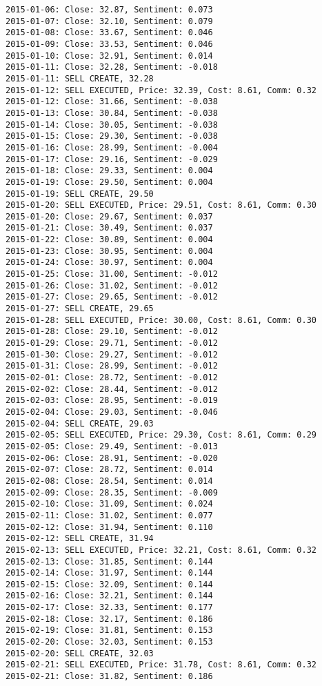 \documentclass[11pt]{article}
\begin{document}
\begin{Verbatim}[commandchars=\\\{\}]
2015-01-06: Close: 32.87, Sentiment: 0.073
2015-01-07: Close: 32.10, Sentiment: 0.079
2015-01-08: Close: 33.67, Sentiment: 0.046
2015-01-09: Close: 33.53, Sentiment: 0.046
2015-01-10: Close: 32.91, Sentiment: 0.014
2015-01-11: Close: 32.28, Sentiment: -0.018
2015-01-11: SELL CREATE, 32.28
2015-01-12: SELL EXECUTED, Price: 32.39, Cost: 8.61, Comm: 0.32
2015-01-12: Close: 31.66, Sentiment: -0.038
2015-01-13: Close: 30.84, Sentiment: -0.038
2015-01-14: Close: 30.05, Sentiment: -0.038
2015-01-15: Close: 29.30, Sentiment: -0.038
2015-01-16: Close: 28.99, Sentiment: -0.004
2015-01-17: Close: 29.16, Sentiment: -0.029
2015-01-18: Close: 29.33, Sentiment: 0.004
2015-01-19: Close: 29.50, Sentiment: 0.004
2015-01-19: SELL CREATE, 29.50
2015-01-20: SELL EXECUTED, Price: 29.51, Cost: 8.61, Comm: 0.30
2015-01-20: Close: 29.67, Sentiment: 0.037
2015-01-21: Close: 30.49, Sentiment: 0.037
2015-01-22: Close: 30.89, Sentiment: 0.004
2015-01-23: Close: 30.95, Sentiment: 0.004
2015-01-24: Close: 30.97, Sentiment: 0.004
2015-01-25: Close: 31.00, Sentiment: -0.012
2015-01-26: Close: 31.02, Sentiment: -0.012
2015-01-27: Close: 29.65, Sentiment: -0.012
2015-01-27: SELL CREATE, 29.65
2015-01-28: SELL EXECUTED, Price: 30.00, Cost: 8.61, Comm: 0.30
2015-01-28: Close: 29.10, Sentiment: -0.012
2015-01-29: Close: 29.71, Sentiment: -0.012
2015-01-30: Close: 29.27, Sentiment: -0.012
2015-01-31: Close: 28.99, Sentiment: -0.012
2015-02-01: Close: 28.72, Sentiment: -0.012
2015-02-02: Close: 28.44, Sentiment: -0.012
2015-02-03: Close: 28.95, Sentiment: -0.019
2015-02-04: Close: 29.03, Sentiment: -0.046
2015-02-04: SELL CREATE, 29.03
2015-02-05: SELL EXECUTED, Price: 29.30, Cost: 8.61, Comm: 0.29
2015-02-05: Close: 29.49, Sentiment: -0.013
2015-02-06: Close: 28.91, Sentiment: -0.020
2015-02-07: Close: 28.72, Sentiment: 0.014
2015-02-08: Close: 28.54, Sentiment: 0.014
2015-02-09: Close: 28.35, Sentiment: -0.009
2015-02-10: Close: 31.09, Sentiment: 0.024
2015-02-11: Close: 31.02, Sentiment: 0.077
2015-02-12: Close: 31.94, Sentiment: 0.110
2015-02-12: SELL CREATE, 31.94
2015-02-13: SELL EXECUTED, Price: 32.21, Cost: 8.61, Comm: 0.32
2015-02-13: Close: 31.85, Sentiment: 0.144
2015-02-14: Close: 31.97, Sentiment: 0.144
2015-02-15: Close: 32.09, Sentiment: 0.144
2015-02-16: Close: 32.21, Sentiment: 0.144
2015-02-17: Close: 32.33, Sentiment: 0.177
2015-02-18: Close: 32.17, Sentiment: 0.186
2015-02-19: Close: 31.81, Sentiment: 0.153
2015-02-20: Close: 32.03, Sentiment: 0.153
2015-02-20: SELL CREATE, 32.03
2015-02-21: SELL EXECUTED, Price: 31.78, Cost: 8.61, Comm: 0.32
2015-02-21: Close: 31.82, Sentiment: 0.186

\end{Verbatim}
\end{document}
